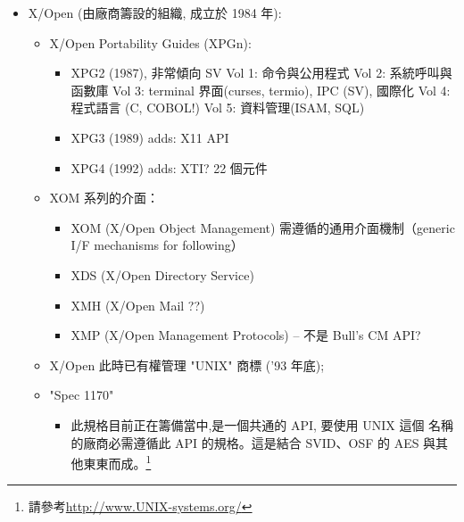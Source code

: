 \documentclass{article}
\begin{document}
\begin{CJK*}{Bg5}{ming}
{\begin{itemize}
      \item X/Open (由廠商籌設的組織, 成立於 1984 年):
      \begin{itemize}
        \item X/Open Portability Guides (XPGn):
	\begin{itemize}
          \item XPG2 (1987), 非常傾向 SV
            Vol 1:  命令與公用程式
            Vol 2:  系統呼叫與函數庫
            Vol 3:  terminal 界面(curses, termio), IPC (SV),
                    國際化
            Vol 4:  程式語言 (C, COBOL!)
            Vol 5:  資料管理(ISAM, SQL)
          \item XPG3 (1989) adds: X11 API
          \item XPG4 (1992) adds: XTI? 22 個元件
	\end{itemize}
        \item XOM 系列的介面：
	\begin{itemize}
          \item XOM (X/Open Object Management) 需遵循的通用介面機制（generic
            I/F mechanisms for following）
          \item XDS (X/Open Directory Service)
          \item XMH (X/Open Mail ??)
          \item XMP (X/Open Management Protocols) -- 不是 Bull's CM API?
	\end{itemize}
        \item X/Open 此時已有權管理 "UNIX" 商標 ('93 年底);
        \item "Spec 1170"
	\begin{itemize}
          \item 此規格目前正在籌備當中,是一個共通的 API, 要使用 UNIX 這個
            名稱的廠商必需遵循此 API 的規格。這是結合 SVID、OSF 的 AES
            與其他東東而成。\footnote{請參考\url{http://www.UNIX-systems.org/}}
	\end{itemize}
      \end{itemize}


\end{itemize}}
\end{CJK*}
\end{document}
